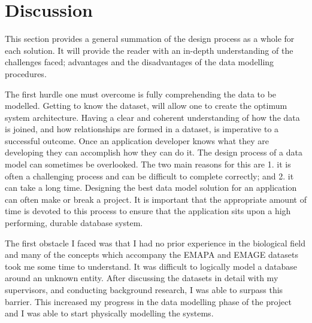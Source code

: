 \newpage
\section{Discussion}\label{designdiscussion}
This section provides a general summation of the design process as a whole for each solution. It will provide the reader with an in-depth understanding of the challenges faced; advantages and the disadvantages of the data modelling procedures.

The first hurdle one must overcome is fully comprehending the data to be modelled. Getting to know the dataset, will allow one to create the optimum system architecture. Having a clear and coherent understanding of how the data is joined, and how relationships are formed in a dataset, is imperative to a successful outcome. Once an application developer knows what they are developing they can accomplish how they can do it. The design process of a data model can sometimes be overlooked. The two main reasons for this are 1. it is often a challenging process and can be difficult to complete correctly; and 2. it can take a long time. Designing the best data model solution for an application can often make or break a project. It is important that the appropriate amount of time is devoted to this process to ensure that the application sits upon a high performing, durable database system.

The first obstacle I faced was that I had no prior experience in the biological field and many of the concepts which accompany the EMAPA and EMAGE datasets took me some time to understand. It was difficult to logically model a database around an unknown entity. After discussing the datasets in detail with my supervisors, and conducting background research, I was able to surpass this barrier. This increased my progress in the data modelling phase of the project and I was able to start physically modelling the systems.

